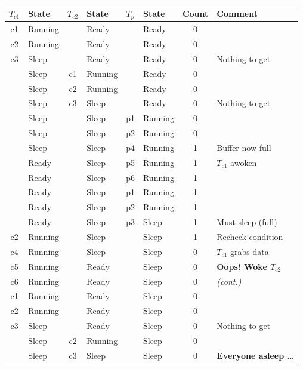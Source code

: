\documentclass[11pt,a4paper]{article}
\newcommand{\Tc}[1]{\(T_{c#1}\)}
\newcommand{\Tp}{\(T_p\)}
\begin{document}
\begin{center}
\small
\renewcommand{\arraystretch}{1.05}
\setlength{\tabcolsep}{4.5pt}
\begin{tabular}{@{}clclclcl@{}}
  \toprule
  \Tc1 & \textbf{State} & \Tc2 & \textbf{State} & \Tp & \textbf{State} & \textbf{Count} & \textbf{Comment} \\
  \midrule
  c1 & Running &    & Ready   &    & Ready   & 0 & \\
  c2 & Running &    & Ready   &    & Ready   & 0 & \\
  c3 & Sleep   &    & Ready   &    & Ready   & 0 & Nothing to get \\
     & Sleep   & c1 & Running &    & Ready   & 0 & \\
     & Sleep   & c2 & Running &    & Ready   & 0 & \\
     & Sleep   & c3 & Sleep   &    & Ready   & 0 & Nothing to get \\
     & Sleep   &    & Sleep   & p1 & Running & 0 & \\
     & Sleep   &    & Sleep   & p2 & Running & 0 & \\
     & Sleep   &    & Sleep   & p4 & Running & 1 & Buffer now full \\
     & Ready   &    & Sleep   & p5 & Running & 1 & \Tc1 awoken \\
     & Ready   &    & Sleep   & p6 & Running & 1 & \\
     & Ready   &    & Sleep   & p1 & Running & 1 & \\
     & Ready   &    & Sleep   & p2 & Running & 1 & \\
     & Ready   &    & Sleep   & p3 & Sleep   & 1 & Must sleep (full) \\
  c2 & Running &    & Sleep   &    & Sleep   & 1 & Recheck condition \\
  c4 & Running &    & Sleep   &    & Sleep   & 0 & \Tc1 grabs data \\
  c5 & Running &    & Ready   &    & Sleep   & 0 & \textbf{Oops! Woke \Tc2} \\
  \midrule
  c6 & Running &    & Ready   &    & Sleep   & 0 & \textit{(cont.)} \\
  c1 & Running &    & Ready   &    & Sleep   & 0 & \\
  c2 & Running &    & Ready   &    & Sleep   & 0 & \\
  c3 & Sleep   &    & Ready   &    & Sleep   & 0 & Nothing to get \\
     & Sleep   & c2 & Running &    & Sleep   & 0 & \\
     & Sleep   & c3 & Sleep   &    & Sleep   & 0 & \textbf{Everyone asleep \ldots} \\
  \bottomrule
\end{tabular}
\end{center}
\end{document}
